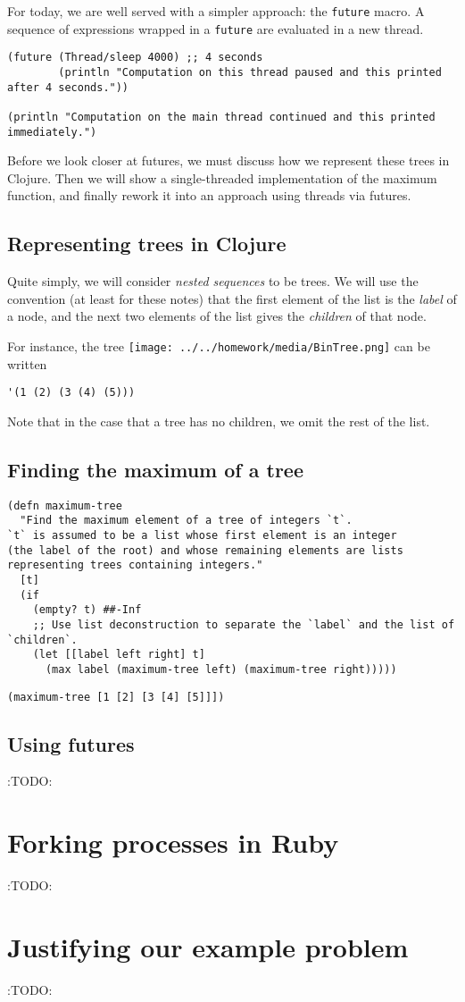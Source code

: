 \documentclass[11pt]{article}
\begin{document}
For today, we are well served with a simpler approach:
the \texttt{future} macro.
A sequence of expressions wrapped in a \texttt{future} are evaluated in
a new thread.
\begin{verbatim}
(future (Thread/sleep 4000) ;; 4 seconds
        (println "Computation on this thread paused and this printed after 4 seconds."))

(println "Computation on the main thread continued and this printed immediately.")
\end{verbatim}

Before we look closer at futures,
we must discuss how we represent these trees in Clojure.
Then we will show a single-threaded implementation of the maximum
function, and finally rework it into an approach using threads via futures.

\subsection{Representing trees in Clojure}
\label{sec:orge2074c0}
Quite simply, we will consider \emph{nested sequences} to be trees.
We will use the convention (at least for these notes)
that the first element of the list is the \emph{label} of a node,
and the next two elements of the list gives the \emph{children} of that node.

For instance, the tree
\texttt{[image: ../../homework/media/BinTree.png]}
can be written
\begin{verbatim}
'(1 (2) (3 (4) (5)))
\end{verbatim}

Note that in the case that a tree has no children,
we omit the rest of the list.

\subsection{Finding the maximum of a tree}
\label{sec:orgfb6cf19}
\begin{verbatim}
(defn maximum-tree
  "Find the maximum element of a tree of integers `t`.
`t` is assumed to be a list whose first element is an integer
(the label of the root) and whose remaining elements are lists
representing trees containing integers."
  [t]
  (if
    (empty? t) ##-Inf
    ;; Use list deconstruction to separate the `label` and the list of `children`.
    (let [[label left right] t]
      (max label (maximum-tree left) (maximum-tree right)))))
\end{verbatim}

\begin{verbatim}
(maximum-tree [1 [2] [3 [4] [5]]])
\end{verbatim}

\subsection{Using futures}
\label{sec:org409f0e4}
:TODO:

\section{Forking processes in Ruby}
\label{sec:org9bbdf09}
:TODO:

\section{Justifying our example problem}
\label{sec:orgf4ac4ab}
:TODO:
\end{document}
